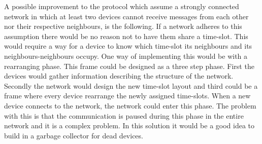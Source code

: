 A possible improvement to the protocol which assume a strongly connected network in which at least two devices cannot receive messages from each other nor their respective neighbours, is the following.
If a network adheres to this assumption there would be no reason not to have them share a time-slot.
This would require a way for a device to know which time-slot its neighbours and its neighbours-neighbours occupy.
One way of implementing this would be with a rearranging phase.
This frame could be designed as a three step phase. 
First the devices would gather information describing the structure of the network.
Secondly the network would design the new time-slot layout and third could be a frame where every device rearrange the newly assigned time-slots.
When a new device connects to the network, the network could enter this phase.
The problem with this is that the communication is paused during this phase in the entire network and it is a complex problem.
In this solution it would be a good idea to build in a garbage collector for dead devices.